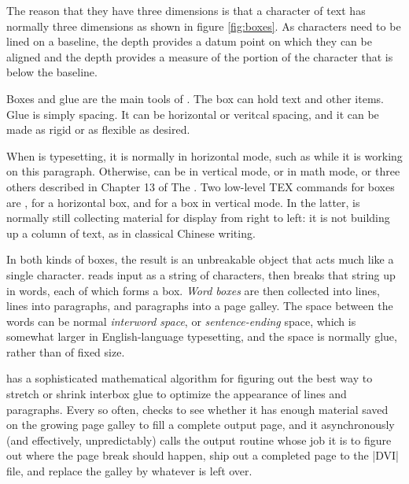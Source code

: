 The reason that they have three dimensions is that a character of text has normally three dimensions as shown in figure \ref{fig:boxes}. As characters need to be lined on a baseline, the depth provides a datum point on which they can be aligned and the depth provides a measure of the portion of the character that is below the baseline.


Boxes and glue are the main tools of \tex. The box can hold text and other items. Glue is simply spacing. It can be horizontal or veritcal spacing, and it can be made as rigid or as flexible as desired.

\bigskip
\noindent{}
\medskip

When \tex is typesetting, it is normally in horizontal mode, such as while
it is working on this paragraph. Otherwise, \tex can be in vertical mode, or
in math mode, or three others described in Chapter 13 of The \texbook.
Two low-level TEX commands for boxes are , for a horizontal box,
and  for a box in vertical mode. In the latter, \tex is normally still
collecting material for display from right to left: it is not building up a
column of text, as in classical Chinese writing.

In both kinds of boxes, the result is an unbreakable object that acts
much like a single character. \tex reads input as a string of characters,
then breaks that string up in words, each of which forms a box. 
\emph{Word boxes}
are then collected into lines, lines into paragraphs, and paragraphs into a
page galley. The space between the words can be normal \emph{interword space},
or \emph{sentence-ending} space, which is somewhat larger in English-language
typesetting, and the space is normally glue, rather than of fixed size.

\tex has a sophisticated mathematical algorithm for figuring out the
best way to stretch or shrink interbox glue to optimize the appearance of
lines and paragraphs. Every so often, \tex checks to see whether it has
enough material saved on the growing page galley to fill a complete output
page, and it asynchronously (and effectively, unpredictably) calls the
output routine whose job it is to figure out where the page break should
happen, ship out a completed page to the |DVI|  file, and replace the galley by
whatever is left over.


